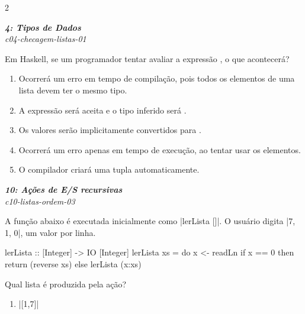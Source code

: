\documentclass[a4paper,10pt,brazil]{article}
\begin{document}
\begin{multicols}{2}
\begin{flushright}
  \footnotesize
  \textit{\textbf{4: Tipos de Dados}}\\
  \textit{c04-checagem-listas-01}\\

\end{flushright}
Em Haskell, se um programador tentar avaliar a expressão , o que acontecerá?

\begin{enumerate}
  \item Ocorrerá um erro em tempo de compilação, pois todos os elementos de uma lista devem ter o mesmo tipo.

  \item A expressão será aceita e o tipo inferido será .

  \item Os valores serão implicitamente convertidos para .

  \item Ocorrerá um erro apenas em tempo de execução, ao tentar usar os elementos.

  \item O compilador criará uma tupla automaticamente.


\end{enumerate}

\begin{flushright}
  \footnotesize
  \textit{\textbf{10: Ações de E/S recursivas}}\\
  \textit{c10-listas-ordem-03}\\

\end{flushright}
A função abaixo é executada inicialmente como \haskellinline|lerLista []|. O usuário digita \haskellinline|7, 1, 0|, um valor por linha.

\begin{haskellcode}
lerLista :: [Integer] -> IO [Integer]
lerLista xs = do
  x <- readLn
  if x == 0
    then return (reverse xs)
    else lerLista (x:xs)
\end{haskellcode}

Qual lista é produzida pela ação?

\begin{enumerate}
  \item \haskellinline|[1,7]|


\end{enumerate}
\end{multicols}
\end{document}

